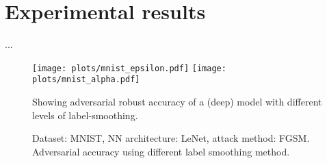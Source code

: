 \section{Experimental results}
...

\begin{figure}[!htp]
    \texttt{[image: plots/mnist\_epsilon.pdf]}
    \texttt{[image: plots/mnist\_alpha.pdf]}
    \caption{Showing adversarial robust accuracy of a (deep) model with different levels of label-smoothing.}
\end{figure}

\begin{figure}%
    \centering
    \caption{Dataset: MNIST, NN architecture: LeNet, attack method: FGSM. Adversarial accuracy using different label smoothing method.}%
    \label{fig:example}%
\end{figure}
